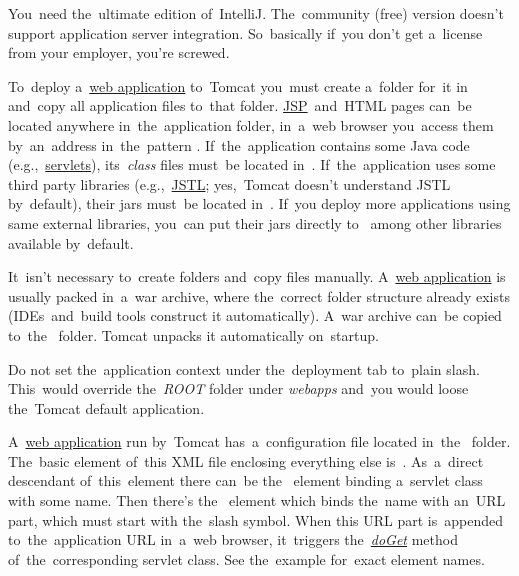 \warning You~need the~ultimate edition of~IntelliJ.
The~community (free) version doesn't support application server integration.
So~basically if~you don't get a~license from your employer, you're screwed.

\label{tomcatdeployment}
To~deploy a~\hyperref[webserviceapplication]{web application} to~Tomcat you~must create a~folder for~it in~ and~copy all application files to~that folder.
\hyperref[jsp]{JSP}~and~HTML pages can~be located anywhere in~the~application folder, in~a~web browser you~access them by~an~address in~the~pattern .
If~the~application contains some Java code (e.g.,~\hyperref[servlet]{servlets}), its~\textit{class} files must~be located in~.
If~the~application uses some third party libraries (e.g.,~\hyperref[jstl]{JSTL}; yes,~Tomcat doesn't understand JSTL by~default), their jars must~be located in~.
If~you deploy more applications using same external libraries, you~can put their jars directly to~ among other libraries available by~default.

It~isn't necessary to~create folders and~copy files manually. A~\hyperref[webserviceapplication]{web application} is usually packed in~a~war archive, where the~correct folder structure already exists (IDEs~and~build tools construct it automatically). A~war archive can~be copied to~the~ folder. Tomcat unpacks it automatically on~startup.


\warning Do not set the~application context under the~deployment tab to~plain slash. This~would override the~\textit{ROOT} folder under \textit{webapps} and~you would loose the~Tomcat default application.

\label{servleturl}
A~\hyperref[webserviceapplication]{web application} run by~Tomcat has~a~configuration file  located in~the~ folder. The~basic element of~this XML file enclosing everything else is~. As~a~direct descendant of~this~element there can~be the~ element binding a~servlet class with some name. Then there's the~ element which binds the~name with an~URL part, which must start with the~slash symbol. When this URL part is~appended to~the~application URL in~a~web browser, it~triggers the~\hyperref[servicedopostdoget]{\textit{doGet}} method of~the~corresponding servlet class. See the~example for~exact element names.

